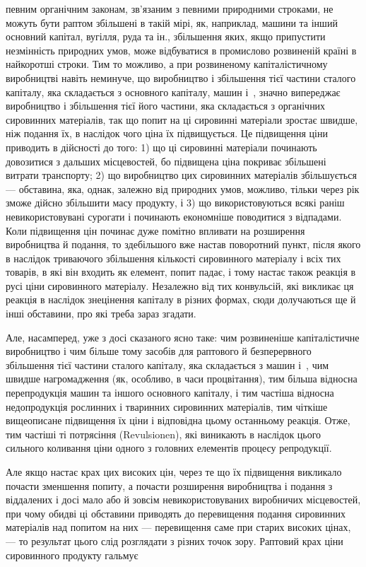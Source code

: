 \parcont{}  %
певним органічним законам, зв’язаним з певними природними
строками, не можуть бути раптом збільшені в такій мірі, як,
наприклад, машини та інший основний капітал, вугілля, руда
та ін., збільшення яких, якщо припустити незмінність природних
умов, може відбуватися в промислово розвиненій країні
в найкоротші строки. Тим то можливо, а при розвиненому капіталістичному
виробництві навіть неминуче, що виробництво і
збільшення тієї частини сталого капіталу, яка складається з
основного капіталу, машин і~, значно випереджає виробництво
і збільшення тієї його частини, яка складається з органічних
сировинних матеріалів, так що попит на ці сировинні матеріали
зростає швидше, ніж подання їх, в наслідок чого ціна їх підвищується.
Це підвищення ціни приводить в дійсності до того:
1) що ці сировинні матеріали починають довозитися з дальших
місцевостей, бо підвищена ціна покриває збільшені витрати транспорту;
2) що виробництво цих сировинних матеріалів збільшується
— обставина, яка, однак, залежно від природних умов,
можливо, тільки через рік зможе дійсно збільшити масу продукту,
і 3) що використовуються всякі раніш невикористовувані
сурогати і починають економніше поводитися з відпадами. Коли
підвищення цін починає дуже помітно впливати на розширення
виробництва й подання, то здебільшого вже настав поворотний
пункт, після якого в наслідок триваючого збільшення кількості
сировинного матеріалу і всіх тих товарів, в які він входить як
елемент, попит падає, і тому настає також реакція в русі ціни
сировинного матеріалу. Незалежно від тих конвульсій, які викликає
ця реакція в наслідок знецінення капіталу в різних формах,
сюди долучаються ще й інші обставини, про які треба
зараз згадати.

Але, насамперед, уже з досі сказаного ясно таке: чим розвиненіше
капіталістичне виробництво і чим більше тому засобів
для раптового й безперервного збільшення тієї частини
сталого капіталу, яка складається з машин і~, чим швидше нагромадження
(як, особливо, в часи процвітання), тим більша відносна
перепродукція машин та іншого основного капіталу, і тим
частіша відносна недопродукція рослинних і тваринних сировинних
матеріалів, тим чіткіше вищеописане підвищення їх ціни і відповідна
цьому останньому реакція. Отже, тим частіші ті потрясіння
(Revulsionen), які виникають в наслідок цього сильного коливання
ціни одного з головних елементів процесу репродукції.

Але якщо настає крах цих високих цін, через те що їх підвищення
викликало почасти зменшення попиту, а почасти розширення
виробництва і подання з віддалених і досі мало або
й зовсім невикористовуваних виробничих місцевостей, при чому
обидві ці обставини приводять до перевищення подання сировинних
матеріалів над попитом на них — перевищення саме при старих
високих цінах, — то результат цього слід розглядати з різних
точок зору. Раптовий крах ціни сировинного продукту гальмує
\parbreak{}  %
